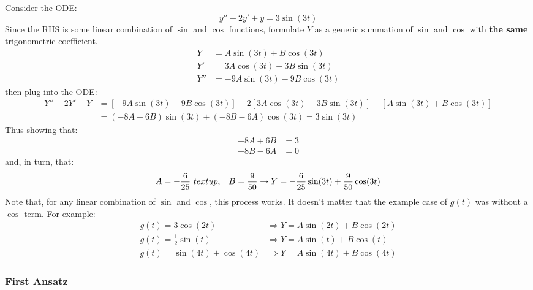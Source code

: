 \documentclass[12pt]{article}
\begin{document}
Consider the ODE:
\begin{equation*}
  y'' - 2y' + y = 3\sin(3t)
\end{equation*}
Since the RHS is some linear combination of $\sin$ and $\cos$ functions, formulate $Y$ as a generic summation of $\sin$ and $\cos$ with \textbf{the same} trigonometric coefficient.
\begin{align*}
  Y   &= A\sin(3t) + B\cos(3t) \\
  Y'  &= 3A\cos(3t) - 3B\sin(3t) \\
  Y'' &= -9A\sin(3t) - 9B\cos(3t)
\end{align*}
then plug into the ODE:
\begin{align*}
  Y'' - 2Y' + Y &= \left[-9A\sin(3t) - 9B\cos(3t)\right] - 2\left[3A\cos(3t) - 3B\sin(3t)\right] + \left[A\sin(3t) + B\cos(3t)\right] \\
                &= (-8A+6B)\sin(3t) + (-8B-6A)\cos(3t) = 3\sin(3t)
\end{align*}
Thus showing that:
\begin{align*}
  -8A + 6B &= 3 \\
  -8B - 6A &= 0
\end{align*}
and, in turn, that:
\begin{equation*}
  A = -\frac{6}{25}\ \ \\textup{,}\ \ \ B =  \frac{9}{50} \rightarrow Y = -\frac{6}{25}\sin(3t)+\frac{9}{50}\cos(3t)
\end{equation*}
Note that, for any linear combination of $\sin$ and $\cos$, this process works. It doesn't matter that the example case of $g(t)$ was without a $\cos$ term. For example:
\begin{align*}
  g(t) = 3\cos(2t)              &\Rightarrow Y = A\sin(2t) + B\cos(2t) \\
  g(t) = \frac{1}{2}\sin(t)     &\Rightarrow Y = A\sin(t) + B\cos(t) \\
  g(t) = \sin(4t) + \cos(4t)    &\Rightarrow Y = A\sin(4t) + B\cos(4t)
\end{align*}

\subsubsection{First Ansatz}
\label{sssec:firstAnsatz}
\end{document}

